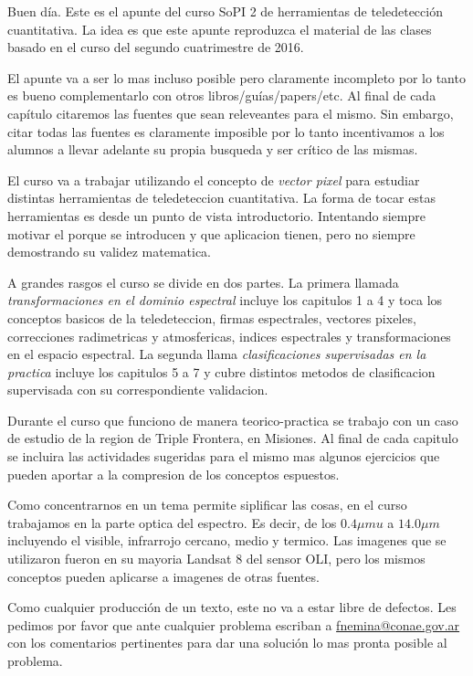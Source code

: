Buen día. Este es el apunte del curso SoPI 2 de herramientas de teledetección
cuantitativa. La idea es que este apunte reproduzca el material de las clases
basado en el curso del segundo cuatrimestre de 2016.

El apunte va a ser lo mas incluso posible pero claramente incompleto por lo
tanto es bueno complementarlo con otros libros/guías/papers/etc. Al final de
cada capítulo citaremos las fuentes que sean releveantes para el mismo. Sin
embargo, citar todas las fuentes es claramente imposible por lo tanto
incentivamos a los alumnos a llevar adelante su propia busqueda y ser crítico de
las mismas.

El curso va a trabajar utilizando el concepto de \emph{vector pixel} para
estudiar distintas herramientas de teledeteccion cuantitativa. La forma de tocar
estas herramientas es desde un punto de vista introductorio. Intentando siempre
motivar el porque se introducen y que aplicacion tienen, pero no siempre
demostrando su validez matematica.

A grandes rasgos el curso se divide en dos partes. La primera llamada
\emph{transformaciones en el dominio espectral} incluye los capitulos 1 a 4 y
toca los conceptos basicos de la teledeteccion, firmas espectrales, vectores
pixeles, correcciones radimetricas y atmosfericas, indices espectrales y
transformaciones en el espacio espectral. La segunda llama \emph{clasificaciones
supervisadas en la practica} incluye los capitulos 5 a 7 y cubre distintos
metodos de clasificacion supervisada con su correspondiente validacion.

Durante el curso que funciono de manera teorico-practica se trabajo con un caso
de estudio de la region de Triple Frontera, en Misiones. Al final de cada
capitulo se incluira las actividades sugeridas para el mismo mas algunos
ejercicios que pueden aportar a la compresion de los conceptos espuestos.

Como concentrarnos en un tema permite siplificar las cosas, en el curso
trabajamos en la parte optica del espectro. Es decir, de los $0.4\mu mu$ a $14.0
\mu m$ incluyendo el visible, infrarrojo cercano, medio y termico. Las imagenes
que se utilizaron fueron en su mayoria Landsat 8 del sensor OLI, pero los mismos
conceptos pueden aplicarse a imagenes de otras fuentes.

Como cualquier producción de un texto, este no va a estar libre de defectos. Les
pedimos por favor que ante cualquier problema escriban a
\url{fnemina@conae.gov.ar} con los comentarios pertinentes para dar una solución
lo mas pronta posible al problema.
